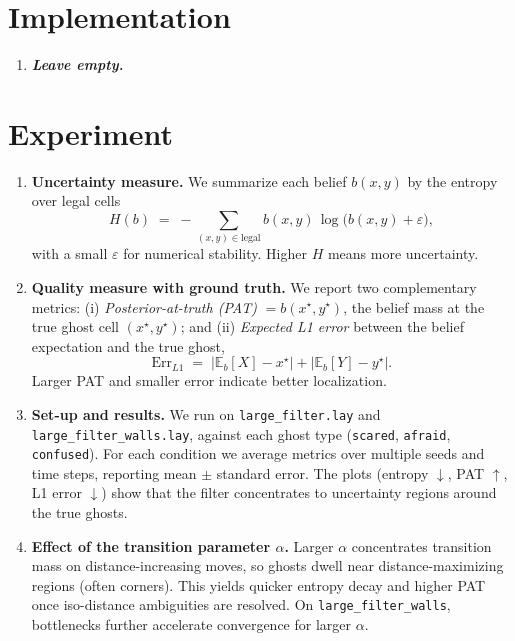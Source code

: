 \documentclass{article}
\begin{document}
\section{Implementation}

\begin{enumerate}[label=\alph*.,leftmargin=*]
    \item \textbf{\textit{Leave empty.}}
\end{enumerate}

\section{Experiment}

\begin{enumerate}[label=\alph*.,leftmargin=*]
    \item \textbf{Uncertainty measure.}
    We summarize each belief $b(x,y)$ by the entropy over legal cells
    \[
      H(b) \;=\; -\sum_{(x,y)\in \text{legal}} b(x,y)\,\log\!\big(b(x,y)+\varepsilon\big),
    \]
    with a small $\varepsilon$ for numerical stability. Higher $H$ means more uncertainty.

    \item \textbf{Quality measure with ground truth.}
    We report two complementary metrics:
    (i) \emph{Posterior-at-truth (PAT)} $= b(x^\star,y^\star)$, the belief mass at the true ghost cell $(x^\star,y^\star)$; and
    (ii) \emph{Expected L1 error} between the belief expectation and the true ghost,
    \[
      \mathrm{Err}_{L1} \;=\; \big|\mathbb{E}_b[X]-x^\star\big| + \big|\mathbb{E}_b[Y]-y^\star\big|.
    \]
    Larger PAT and smaller error indicate better localization.

    \item \textbf{Set-up and results.}
    We run on \texttt{large\_filter.lay} and \texttt{large\_filter\_walls.lay}, against each ghost type (\texttt{scared}, \texttt{afraid}, \texttt{confused}).
    For each condition we average metrics over multiple seeds and time steps, reporting mean $\pm$ standard error.
    The plots (entropy $\downarrow$, PAT $\uparrow$, L1 error $\downarrow$) show that the filter concentrates to uncertainty regions around the true ghosts.

    \item \textbf{Effect of the transition parameter $\alpha$.}
    Larger $\alpha$ concentrates transition mass on distance-increasing moves, so ghosts dwell near distance-maximizing regions (often corners).
    This yields quicker entropy decay and higher PAT once iso-distance ambiguities are resolved.
    On \texttt{large\_filter\_walls}, bottlenecks further accelerate convergence for larger $\alpha$.


\end{enumerate}
\end{document}
